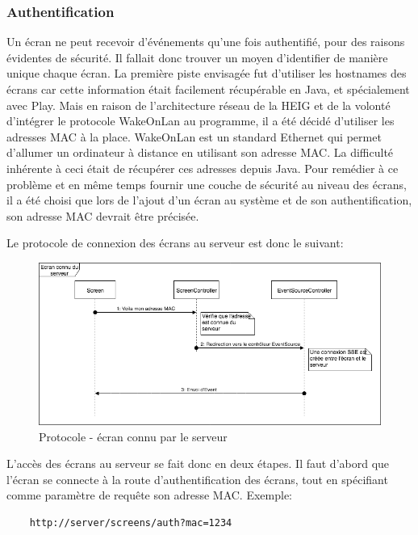 \documentclass[french]{article}
\begin{document}
\subsubsection{Authentification}
Un écran ne peut recevoir d'événements qu'une fois authentifié, pour des raisons évidentes de sécurité. Il fallait donc trouver un moyen d'identifier de manière unique chaque écran. La première piste envisagée fut d'utiliser les hostnames des écrans car cette information était facilement récupérable en Java, et spécialement avec Play. Mais en raison de l'architecture réseau de la HEIG et de la volonté d'intégrer le protocole WakeOnLan au programme, il a été décidé d'utiliser les adresses MAC à la place. WakeOnLan est un standard Ethernet qui permet d'allumer un ordinateur à distance en utilisant son adresse MAC.\newline 
La difficulté inhérente à ceci était de récupérer ces adresses depuis Java. Pour remédier à ce problème et en même temps fournir une couche de sécurité au niveau des écrans, il a été choisi que lors de l'ajout d'un écran au système et de son authentification, son adresse MAC devrait être précisée. \newline

\newpage
Le protocole de connexion des écrans au serveur est donc le suivant:

	\begin{figure}[h]
		\centering	
		\includegraphics[scale=0.5]{schemas/screen_protocol.png}
		\caption{Protocole - écran connu par le serveur}
	\end{figure}

L'accès des écrans au serveur se fait donc en deux étapes. Il faut d'abord que l'écran se connecte à la route d'authentification des écrans, tout en spécifiant 
comme paramètre de requête son adresse MAC. Exemple:
\begin{verbatim}
	http://server/screens/auth?mac=1234
\end{verbatim}
\end{document}
